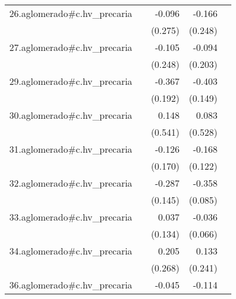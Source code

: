 {\begin{longtable}{l*{4}{D{.}{.}{-1}}}
\addlinespace
26.aglomerado#c.hv\_precaria&                     &      -0.096         &      -0.166         &                     \\
            &                     &     (0.275)         &     (0.248)         &                     \\
\addlinespace
27.aglomerado#c.hv\_precaria&                     &      -0.105         &      -0.094         &                     \\
            &                     &     (0.248)         &     (0.203)         &                     \\
\addlinespace
29.aglomerado#c.hv\_precaria&                     &      -0.367         &      -0.403\sym{**} &                     \\
            &                     &     (0.192)         &     (0.149)         &                     \\
\addlinespace
30.aglomerado#c.hv\_precaria&                     &       0.148         &       0.083         &                     \\
            &                     &     (0.541)         &     (0.528)         &                     \\
\addlinespace
31.aglomerado#c.hv\_precaria&                     &      -0.126         &      -0.168         &                     \\
            &                     &     (0.170)         &     (0.122)         &                     \\
\addlinespace
32.aglomerado#c.hv\_precaria&                     &      -0.287\sym{*}  &      -0.358\sym{***}&                     \\
            &                     &     (0.145)         &     (0.085)         &                     \\
\addlinespace
33.aglomerado#c.hv\_precaria&                     &       0.037         &      -0.036         &                     \\
            &                     &     (0.134)         &     (0.066)         &                     \\
\addlinespace
34.aglomerado#c.hv\_precaria&                     &       0.205         &       0.133         &                     \\
            &                     &     (0.268)         &     (0.241)         &                     \\
\addlinespace
36.aglomerado#c.hv\_precaria&                     &      -0.045         &      -0.114         &                     \\

\end{longtable}}
